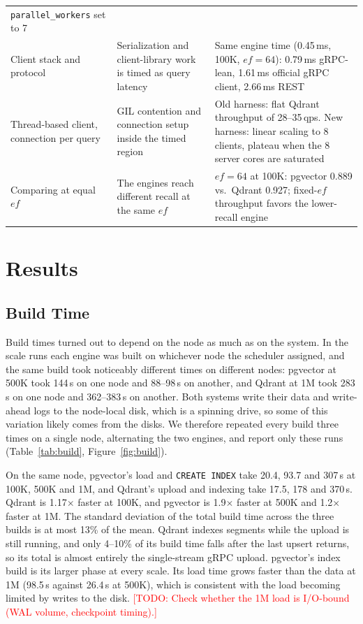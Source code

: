 \documentclass[sigconf, nonacm]{acmart}
\newcommand{\todo}[1]{\textcolor{red}{[TODO: #1]}}
\newcommand{\todo}[1]{\errmessage{Unresolved TODO: #1}}
\begin{document}
\begin{table}[t]
\begin{tabular}{p{}p{}p{}}
      \texttt{parallel\_workers} set to 7 \\
    Client stack and protocol &
      Serialization and client-library work is timed as query latency &
      Same engine time (0.45\,ms, 100K, $ef=64$): 0.79\,ms gRPC-lean, 1.61\,ms official
      gRPC client, 2.66\,ms REST \\
    Thread-based client, connection per query &
      GIL contention and connection setup inside the timed region &
      Old harness: flat Qdrant throughput of 28--35\,qps. New harness: linear scaling to
      8 clients, plateau when the 8 server cores are saturated \\
    Comparing at equal $ef$ &
      The engines reach different recall at the same $ef$ &
      $ef=64$ at 100K: pgvector 0.889 vs.\ Qdrant 0.927; fixed-$ef$ throughput favors the
      lower-recall engine \\
    \bottomrule
  \end{tabular}
\end{table}

\section{Results}

\subsection{Build Time}

Build times turned out to depend on the node as much as on the system. In the scale
runs each engine was built on whichever node the scheduler assigned, and the same
build took noticeably different times on different nodes: pgvector at 500K took 144\,s
on one node and 88--98\,s on another, and Qdrant at 1M took 283\,s on one node and
362--383\,s on another. Both systems write their data and write-ahead logs to the
node-local disk, which is a spinning drive, so some of this variation likely comes from
the disks. We therefore repeated every build three times on a single node, alternating
the two engines, and report only these runs (Table~\ref{tab:build},
Figure~\ref{fig:build}).

On the same node, pgvector's load and \texttt{CREATE INDEX} take 20.4, 93.7 and 307\,s
at 100K, 500K and 1M, and Qdrant's upload and indexing take 17.5, 178 and 370\,s. Qdrant
is 1.17$\times$ faster at 100K, and pgvector is 1.9$\times$ faster at 500K and
1.2$\times$ faster at 1M. The standard deviation of the total build time across the three
builds is at most 13\% of the mean. Qdrant indexes segments while the upload is still running, and only
4--10\% of its build time falls after the last upsert returns, so its total is almost
entirely the single-stream gRPC upload. pgvector's index build is its larger phase at
every scale. Its load time grows faster than the data at 1M (98.5\,s against 26.4\,s at
500K), which is consistent with the load becoming limited by writes to the disk.
\todo{Check whether the 1M load is I/O-bound (WAL volume, checkpoint timing).}
\end{document}
